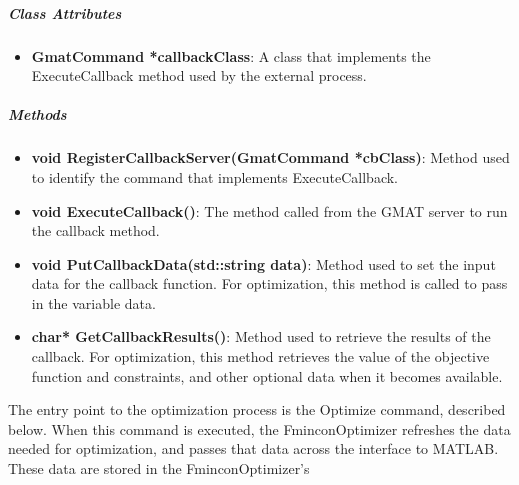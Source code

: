 \subparagraph{\textit{Class Attributes}}
\begin{itemize}
\item \textbf{GmatCommand *callbackClass}: A class that implements the ExecuteCallback method used
by the external process.
\end{itemize}

\subparagraph{\textit{Methods}}
\begin{itemize}
\item \textbf{void RegisterCallbackServer(GmatCommand *cbClass)}: Method used to identify the
command that implements ExecuteCallback.
\item \textbf{void ExecuteCallback()}: The method called from the GMAT server to run the callback
method.
\item \textbf{void PutCallbackData(std::string data)}: Method used to set the input data for the
callback function.  For optimization, this method is called to pass in the variable data.
\item \textbf{char* GetCallbackResults()}:  Method used to retrieve the results of the callback.
For optimization, this method retrieves the value of the objective function and constraints, and
other optional data when it becomes available.
\end{itemize}

The entry point to the optimization process is the Optimize command, described below.  When this
command is executed, the FminconOptimizer refreshes the data needed for optimization, and passes
that data across the interface to MATLAB.  These data are stored in the FminconOptimizer's

